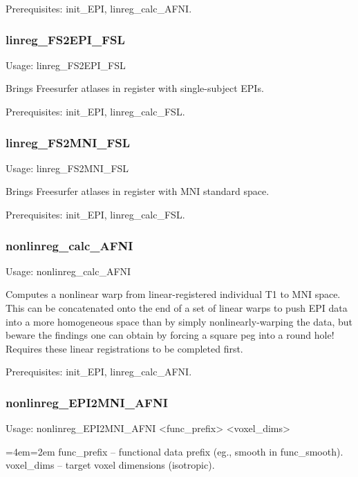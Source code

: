 \documentclass[final,titlepage,letterpaper,oneside,12pt]{article}
\renewcommand{\texttt}[2][BrickRed]{\textcolor{#1}{\ttfamily #2}}%
\newenvironment{blockquote}{%
  \par%
  \medskip
  \leftskip=4em\rightskip=2em%
  \noindent\ignorespaces}{%
  \par\medskip}
\begin{document}
Prerequisites: \texttt{init\_EPI}, \texttt{linreg\_calc\_AFNI}.

\subsubsection{linreg\_FS2EPI\_FSL}
Usage: \texttt{linreg\_FS2EPI\_FSL}

\noindent Brings Freesurfer atlases in register with single-subject EPIs.

Prerequisites: \texttt{init\_EPI}, \texttt{linreg\_calc\_FSL}.

\subsubsection{linreg\_FS2MNI\_FSL}
Usage: \texttt{linreg\_FS2MNI\_FSL}

\noindent Brings Freesurfer atlases in register with MNI standard space.

Prerequisites: \texttt{init\_EPI}, \texttt{linreg\_calc\_FSL}.


\subsubsection{nonlinreg\_calc\_AFNI}
Usage: \texttt{nonlinreg\_calc\_AFNI}

\noindent Computes a nonlinear warp from linear-registered individual T1 to MNI space. This can be concatenated onto the end of a set of linear warps to push EPI data into a more homogeneous space than by simply nonlinearly-warping the data, but beware the findings one can obtain by forcing a square peg into a round hole! Requires these linear registrations to be completed first.

Prerequisites: \texttt{init\_EPI}, \texttt{linreg\_calc\_AFNI}.

\subsubsection{nonlinreg\_EPI2MNI\_AFNI}
Usage: \texttt{nonlinreg\_EPI2MNI\_AFNI <func\_prefix> <voxel\_dims>}

\begin{blockquote}
func\_prefix -- functional data prefix (eg., smooth in func\_smooth). \\
voxel\_dims -- target voxel dimensions (isotropic). \
\end{blockquote}
\end{document}
